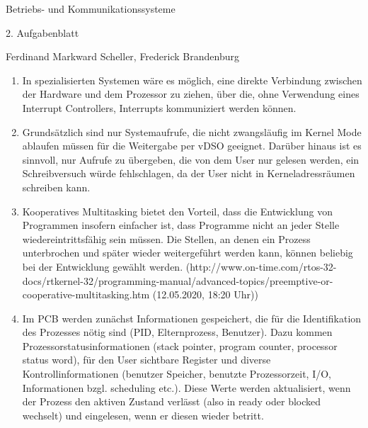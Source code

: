 \documentclass[11pt]{article}
\begin{document}
\begin{center}

Betriebs- und Kommunikationssysteme

{\Large2. Aufgabenblatt}

Ferdinand Markward Scheller, Frederick Brandenburg

\end{center}

\begin{enumerate}
	
	\item In spezialisierten Systemen w\"are es m\"oglich, eine direkte Verbindung zwischen der Hardware und dem Prozessor zu ziehen, \"uber die, ohne Verwendung eines Interrupt Controllers, Interrupts kommuniziert werden k\"onnen.

	\item Grunds\"atzlich sind nur Systemaufrufe, die nicht zwangsl\"aufig im Kernel Mode ablaufen m\"ussen f\"ur die Weitergabe per vDSO geeignet. Dar\"uber hinaus ist es sinnvoll, nur Aufrufe zu \"ubergeben, die von dem User nur gelesen werden, ein Schreibversuch w\"urde fehlschlagen, da der User nicht in Kerneladressr\"aumen schreiben kann.

	\item Kooperatives Multitasking bietet den Vorteil, dass die Entwicklung von Programmen insofern einfacher ist, dass Programme nicht an jeder Stelle wiedereintrittsf\"ahig sein m\"ussen. Die Stellen, an denen ein Prozess unterbrochen und sp\"ater wieder weitergef\"uhrt werden kann, k\"onnen beliebig bei der Entwicklung gew\"ahlt werden. (http://www.on-time.com/rtos-32-docs/rtkernel-32/programming-manual/advanced-topics/preemptive-or-cooperative-multitasking.htm (12.05.2020, 18:20 Uhr))

	\item Im PCB werden zun\"achst Informationen gespeichert, die f\"ur die Identifikation des Prozesses n\"otig sind (PID, Elternprozess, Benutzer). Dazu kommen Prozessorstatusinformationen (stack pointer, program counter, processor status word), f\"ur den User sichtbare Register und diverse Kontrollinformationen (benutzer Speicher, benutzte Prozessorzeit, I/O, Informationen bzgl. scheduling etc.). Diese Werte werden aktualisiert, wenn der Prozess den aktiven Zustand verl\"asst (also in ready oder blocked wechselt) und eingelesen, wenn er diesen wieder betritt.
		
\end{enumerate}
\end{document}
